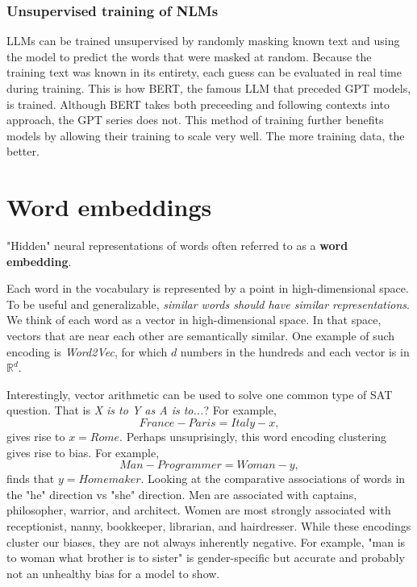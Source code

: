 \documentclass[titlepage, 12pt, leqno]{article}
\begin{document}
\subsubsection{Unsupervised training of NLMs}
LLMs can be trained unsupervised by randomly masking known text and using the
model to predict the words that were masked at random. Because the training
text was known in its entirety, each guess can be evaluated in real time during
training. This is how BERT, the famous LLM that preceded GPT models, is trained.
Although BERT takes both preceeding and following contexts into approach, the
GPT series does not. This method of training further benefits models by allowing
their training to scale very well. The more training data, the better.

\pagebreak

\section{Word embeddings}
\begin{definition}
    "Hidden" neural representations of words often referred to as a
    \textbf{word embedding}.
\end{definition}
Each word in the vocabulary is represented by a point in high-dimensional space.
To be useful and generalizable, \textit{similar words should have similar
representations}. We think of each word as a vector in high-dimensional space.
In that space, vectors that are near each other are semantically similar.
One example of such encoding is \textit{Word2Vec}, for which $d$ numbers in the
hundreds and each vector is in $ \mathbb{R}^{d}$.

Interestingly, vector arithmetic can be used to solve one common type of SAT
question. That is \textit{X is to Y as A is to...}? For example, 
\[
France - Paris = Italy - x,
\]
gives rise to $x = Rome$. Perhaps unsuprisingly, this word encoding clustering
gives rise to bias. For example,
\[
Man - Programmer = Woman - y,
\]
finds that $y = Homemaker$. Looking at the comparative associations of words in
the "he" direction vs "she" direction. Men are associated with captains,
philosopher, warrior, and architect. Women are most strongly associated with
receptionist, nanny, bookkeeper, librarian, and hairdresser. While these
encodings cluster our biases, they are not always inherently negative. For
example, "man is to woman what brother is to sister" is gender-specific but
accurate and probably not an unhealthy bias for a model to show.
\end{document}
